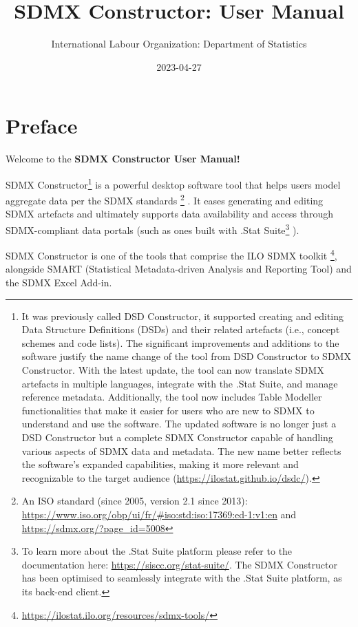 \documentclass[
]{book}
\title{SDMX Constructor: User Manual}
\author{International Labour Organization: Department of Statistics}
\date{2023-04-27}
\theoremstyle{definition}
\theoremstyle{definition}
\theoremstyle{definition}
\theoremstyle{definition}
\theoremstyle{remark}
\begin{document}
\maketitle

{
\setcounter{tocdepth}{1}
\tableofcontents
}
\hypertarget{preface}{%
\chapter*{Preface}\label{preface}}

Welcome to the \textbf{SDMX Constructor User Manual!}

SDMX Constructor\footnote{It was previously called DSD Constructor, it supported creating and editing Data Structure Definitions (DSDs) and their related artefacts (i.e., concept schemes and code lists). The significant improvements and additions to the software justify the name change of the tool from DSD Constructor to SDMX Constructor. With the latest update, the tool can now translate SDMX artefacts in multiple languages, integrate with the .Stat Suite, and manage reference metadata. Additionally, the tool now includes Table Modeller functionalities that make it easier for users who are new to SDMX to understand and use the software. The updated software is no longer just a DSD Constructor but a complete SDMX Constructor capable of handling various aspects of SDMX data and metadata. The new name better reflects the software's expanded capabilities, making it more relevant and recognizable to the target audience (\url{https://ilostat.github.io/dsdc/}).} is a powerful desktop software tool that helps users model aggregate data per the SDMX standards \footnote{An ISO standard (since 2005, version 2.1 since 2013): \url{https://www.iso.org/obp/ui/fr/\#iso:std:iso:17369:ed-1:v1:en} and \url{https://sdmx.org/?page_id=5008}} . It eases generating and editing SDMX artefacts and ultimately supports data availability and access through SDMX-compliant data portals (such as ones built with .Stat Suite\footnote{To learn more about the .Stat Suite platform please refer to the documentation here: \url{https://siscc.org/stat-suite/}. The SDMX Constructor has been optimised to seamlessly integrate with the .Stat Suite platform, as its back-end client.} ).

SDMX Constructor is one of the tools that comprise the ILO SDMX toolkit \footnote{\url{https://ilostat.ilo.org/resources/sdmx-tools/}}, alongside SMART (Statistical Metadata-driven Analysis and Reporting Tool) and the SDMX Excel Add-in.
\end{document}

